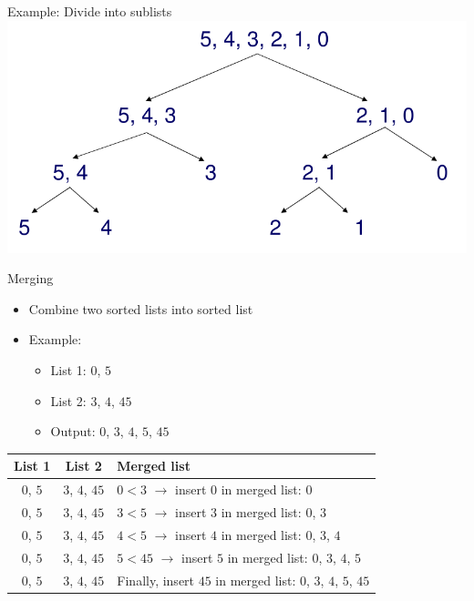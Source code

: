 \begin{frame}{Example: Divide into sublists}
  \includegraphics[width=\textwidth]{figures/mergesort-divide}  
\end{frame}

\begin{frame}{Merging}
  \begin{itemize}
  \item Combine two sorted lists into sorted list
  \item Example:
    \begin{itemize}
    \item List 1: $0$, $5$
    \item List 2: $3$, $4$, $45$
    \item Output: $0$, $3$, $4$, $5$, $45$
    \end{itemize}
  \end{itemize}

  
  \begin{center}
    \begin{tabular}{c|c|l}
      List 1 & List 2 & Merged list \\\hline
      \alert{$0$}, $5$ & $3$, $4$, $45$ & $0 < 3$ $\rightarrow$ insert $0$ in merged list: \alert{$0$} \\
      $0$, \alert{$5$} & \alert{$3$}, $4$, $45$ & $3 < 5$ $\rightarrow$ insert $3$ in merged list: $0$, \alert{$3$} \\
      $0$, \alert{$5$} & $3$, \alert{$4$}, $45$ & $4 < 5$ $\rightarrow$ insert $4$ in merged list: $0$, $3$, \alert{$4$} \\
      $0$, \alert{$5$} & $3$, $4$, \alert{$45$} & $5 < 45$ $\rightarrow$ insert $5$ in merged list: $0$, $3$, $4$, \alert{$5$} \\
      $0$, $5$ & $3$, $4$, \alert{$45$} & Finally, insert $45$ in merged list: $0$, $3$, $4$, $5$, \alert{$45$} \\
    \end{tabular}        
  \end{center}  
\end{frame}

